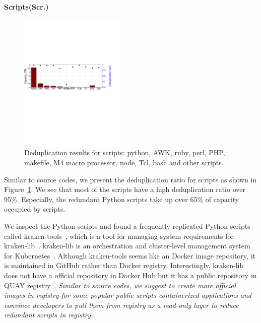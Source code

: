 \paragraph{Scripts(Scr.)}
%
%

\begin{figure} 
	\centering
	\includegraphics[width=0.45\textwidth]{graphs/dedup-scrp}
	\caption{Deduplication results for scripts: python, AWK, ruby, perl, PHP, makefile, M4 macro processor, node, Tcl, bash and other scripts.}
	\label{fig:dedup-scrp} 
\end{figure}

Similar to source codes, we present the deduplication ratio for scripts as
shown in Figure~\ref{fig:dedup-scrp}.  
%
We see that most of the scripts have a
high deduplication ratio over 95\%. 
%
Especially, the redundant Python scripts
take up over 65\% of capacity occupied by scripts. 

We inspect the Python scripts and found a frequently replicated Python scripts
called kraken-tools~\cite{krakentools}, which is a tool for managing system
requirements for kraken-lib~\cite{krakenlib}. 
%
kraken-lib is an orchestration and
cluster-level management system for Kubernetes~\cite{kubernetes}.
%
Although kraken-tools seems like an Docker image repository, it is maintained
in GitHub rather than Docker registry. 
%
Interestingly, kraken-lib does not have
a official repository in Docker Hub but it has a public repository in QUAY
registry~\cite{quay}.  
%
\textit{Similar to source codes, we suggest to create
more official images in registry for some popular public scripts %
containerized applications and convince developers to pull them from registry
as a read-only layer to reduce redundant scripts in registry.}

